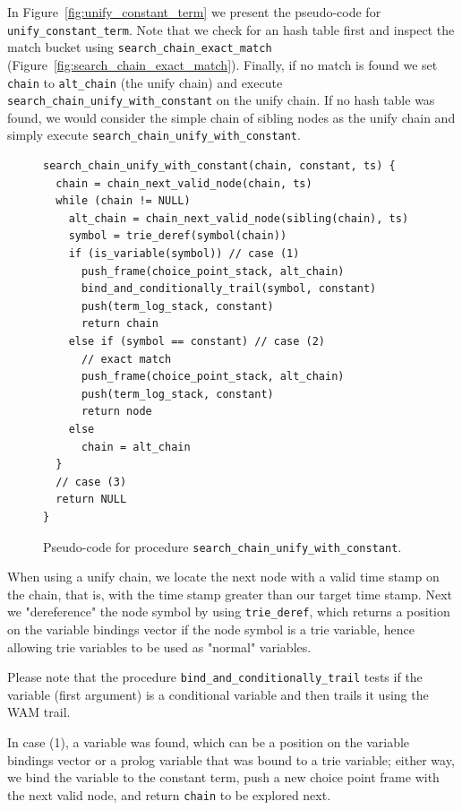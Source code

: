 In Figure~\ref{fig:unify_constant_term} we present the pseudo-code for \texttt{unify\_constant\_term}. Note that we check for an hash table first and inspect the match bucket using \texttt{search\_chain\_exact\_match} (Figure~\ref{fig:search_chain_exact_match}).
Finally, if no match is found we set \texttt{chain} to \texttt{alt\_chain} (the unify chain) and execute \texttt{search\_chain\_unify\_with\_constant} on the unify chain. If no hash table was found, we would consider the simple chain of sibling nodes as the unify chain and simply execute \texttt{search\_chain\_unify\_with\_constant}.

\begin{figure}[ht]
\begin{Verbatim}
search_chain_unify_with_constant(chain, constant, ts) {
  chain = chain_next_valid_node(chain, ts)
  while (chain != NULL)
    alt_chain = chain_next_valid_node(sibling(chain), ts)
    symbol = trie_deref(symbol(chain))
    if (is_variable(symbol)) // case (1)
      push_frame(choice_point_stack, alt_chain)
      bind_and_conditionally_trail(symbol, constant)
      push(term_log_stack, constant)
      return chain
    else if (symbol == constant) // case (2)
      // exact match
      push_frame(choice_point_stack, alt_chain)
      push(term_log_stack, constant)
      return node
    else
      chain = alt_chain
  }
  // case (3)
  return NULL
}
\end{Verbatim}
\caption{Pseudo-code for procedure \texttt{search\_chain\_unify\_with\_constant}.}
\label{fig:search_chain_unify_with_constant}
\end{figure}

When using a unify chain, we locate the next node with a valid time stamp on the chain, that is,
with the time stamp greater than our target time stamp. Next we "dereference" the node symbol by using
\texttt{trie\_deref}, which returns a position on the variable bindings vector if the node symbol
is a trie variable, hence allowing trie variables to be used as "normal" variables.

Please note that the procedure \texttt{bind\_and\_conditionally\_trail} tests if the variable (first argument)
is a conditional variable and then trails it using the WAM trail.

In case (1), a variable was found, which can be a position on the variable bindings vector or a prolog
variable that was bound to a trie variable; either way, we bind the variable to the constant term,
push a new choice point frame with the next valid node, and return \texttt{chain} to be explored next.

